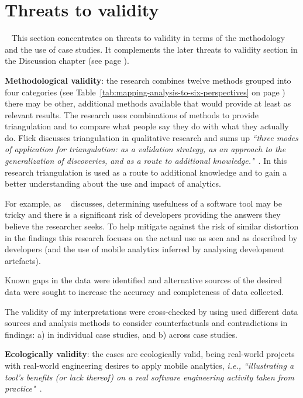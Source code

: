 \section{Threats to validity}~\label{methodology-threats-to-validity-section}
This section concentrates on threats to validity in terms of the methodology and the use of case studies. It complements the later threats to validity section in the Discussion chapter (see page \pageref{discussion-threats-to-validity-section}).

\textbf{Methodological validity}: the research combines twelve methods grouped into four categories (see Table~\ref{tab:mapping-analysis-to-six-perspectives} on page \pageref{tab:mapping-analysis-to-six-perspectives}) there may be other, additional methods available that would provide at least as relevant results. The research uses combinations of methods to provide triangulation and to compare what people say they do with what they actually do. Flick discusses triangulation in qualitative research and sums up \emph{``three modes of application for triangulation: as a validation strategy, as an approach to the generalization of discoveries, and as a route to additional knowledge."}~\citep[p.183]{flick2004_triangulation_in_qualitative_research}. In this research triangulation is used as a route to additional knowledge and to gain a better understanding about the use and impact of analytics.

For example, as ~\citealt[pp.132-133]{Ko2015_a_practical_guide_to_controlled_experiments_of_sw_eng_tools_with_human_participants} discusses, determining usefulness of a software tool may be tricky and there is a significant risk of developers providing the answers they believe the researcher seeks. To help mitigate against the risk of similar distortion in the findings this research focuses on the actual use as seen and as described by developers (and the use of mobile analytics inferred by analysing development artefacts).

Known gaps in the data were identified and alternative sources of the desired data were sought to increase the accuracy and completeness of data collected.

The validity of my interpretations were cross-checked by using used different data sources and analysis methods to consider counterfactuals and contradictions in findings: a) in individual case studies, and b) across case studies.

\textbf{Ecologically validity}: the cases are ecologically valid, being real-world projects with real-world engineering desires to apply mobile analytics, \emph{i.e., ``illustrating a tool’s benefits (or lack thereof) on a real software engineering activity taken from practice"}~\citep[p.126]{Ko2015_a_practical_guide_to_controlled_experiments_of_sw_eng_tools_with_human_participants}.

